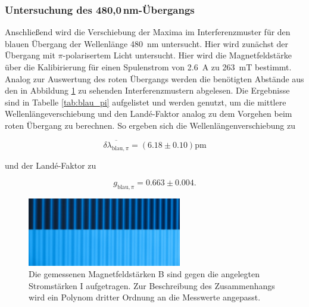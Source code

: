         \subsubsection*{Untersuchung des 480,0\,nm-Übergangs}
            Anschließend wird die Verschiebung der Maxima im Interferenzmuster für den blauen Übergang der Wellenlänge \SI{480}{\nano\metre} untersucht. Hier wird zunächst der Übergang mit $\pi$-polarisertem
            Licht untersucht. Hier wird die Magnetfeldstärke über die Kalibirierung für einen Spulenstrom von \SI{2.6}{\ampere} zu \SI{263}{\milli\tesla} bestimmt. Analog zur Auswertung des roten Übergangs 
            werden die benötigten Abstände aus den in Abbildung \ref{fig:blau_pi} zu sehenden Interferenzmustern abgelesen. Die Ergebnisse sind in 
            Tabelle \ref{tab:blau_pi} aufgelistet und werden genutzt, um die mittlere Wellenlängeverschiebung und den Landé-Faktor analog zu dem Vorgehen beim roten Übergang zu berechnen. So ergeben sich die
            Wellenlängenverschiebung zu

            \begin{equation*}
                \overline{\delta \lambda_{\text{blau}, \pi}} = \left(6.18 \pm 0.10\right)\si{\pico\metre}
            \end{equation*}

            und der Landé-Faktor zu

            \begin{equation*}
              g_{\text{blau}, \pi} = 0.663 \pm 0.004 .
            \end{equation*}

            \FloatBarrier

            \begin{figure}[h]
              \centering
              \includegraphics[width = 0.6\textwidth]{pictures/blau_pi.png}
              \caption{Die gemessenen Magnetfeldstärken B sind gegen die angelegten Stromstärken I aufgetragen. Zur Beschreibung des Zusammenhangs wird ein Polynom dritter Ordnung an die Messwerte angepasst.}
              \label{fig:blau_pi}
            \end{figure}
        
